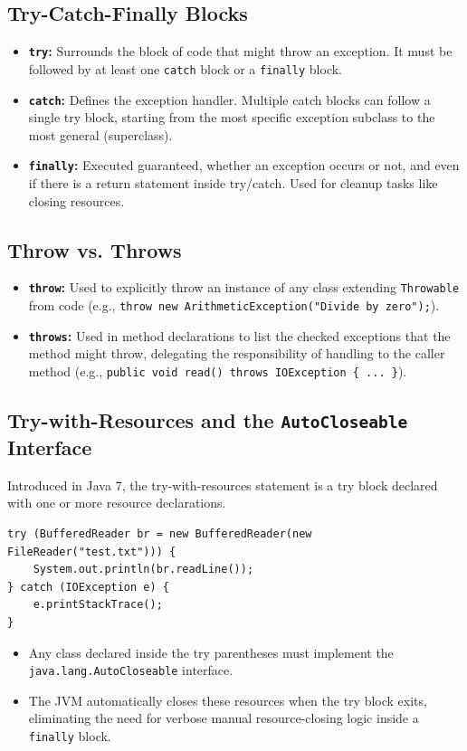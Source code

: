 \documentclass[12pt,a4paper]{article}
\begin{document}
\subsection{Try-Catch-Finally Blocks}
\begin{itemize}[leftmargin=*, itemsep=4pt]
  \item \textbf{\texttt{try}:} Surrounds the block of code that might throw an exception. It must be followed by at least one \texttt{catch} block or a \texttt{finally} block.
  \item \textbf{\texttt{catch}:} Defines the exception handler. Multiple catch blocks can follow a single try block, starting from the most specific exception subclass to the most general (superclass).
  \item \textbf{\texttt{finally}:} Executed guaranteed, whether an exception occurs or not, and even if there is a return statement inside try/catch. Used for cleanup tasks like closing resources.
\end{itemize}

\subsection{Throw vs. Throws}
\begin{itemize}[leftmargin=*, itemsep=4.5pt]
  \item \textbf{\texttt{throw}:} Used to explicitly throw an instance of any class extending \texttt{Throwable} from code (e.g., \texttt{throw new ArithmeticException("Divide by zero");}).
  \item \textbf{\texttt{throws}:} Used in method declarations to list the checked exceptions that the method might throw, delegating the responsibility of handling to the caller method (e.g., \texttt{public void read() throws IOException \{ ... \}}).
\end{itemize}

\subsection{Try-with-Resources and the \texttt{AutoCloseable} Interface}
Introduced in Java 7, the try-with-resources statement is a try block declared with one or more resource declarations.
\begin{verbatim}
try (BufferedReader br = new BufferedReader(new FileReader("test.txt"))) {
    System.out.println(br.readLine());
} catch (IOException e) {
    e.printStackTrace();
}
\end{verbatim}
\begin{itemize}[leftmargin=*, itemsep=3.5pt]
  \item Any class declared inside the try parentheses must implement the \texttt{java.lang.AutoCloseable} interface.
  \item The JVM automatically closes these resources when the try block exits, eliminating the need for verbose manual resource-closing logic inside a \texttt{finally} block.
\end{itemize}
\end{document}
